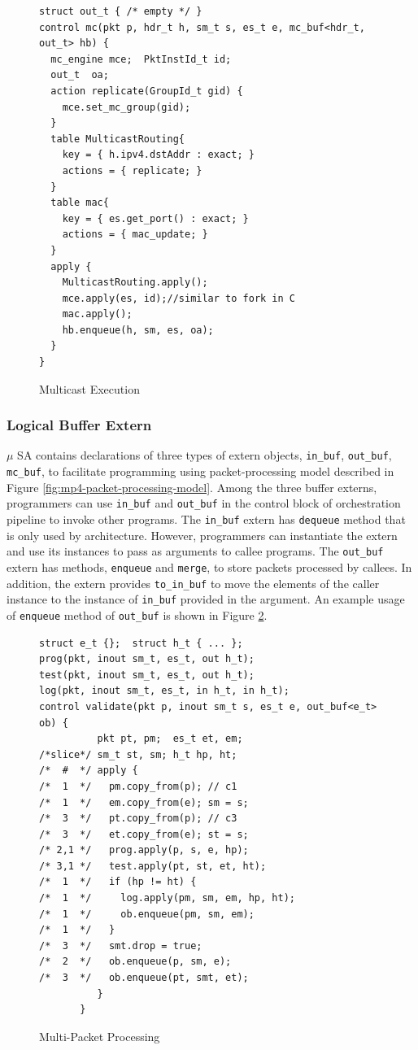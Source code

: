 \begin{figure}[!h]
\begin{lstlisting}[frame=none]
struct out_t { /* empty */ }
control mc(pkt p, hdr_t h, sm_t s, es_t e, mc_buf<hdr_t, out_t> hb) {
  mc_engine mce;  PktInstId_t id; 
  out_t  oa;
  action replicate(GroupId_t gid) {
    mce.set_mc_group(gid);
  }
  table MulticastRouting{
    key = { h.ipv4.dstAddr : exact; } 
    actions = { replicate; }
  }
  table mac{
    key = { es.get_port() : exact; } 
    actions = { mac_update; }
  }
  apply {
    MulticastRouting.apply();
    mce.apply(es, id);//similar to fork in C
    mac.apply();
    hb.enqueue(h, sm, es, oa);
  }
}
\end{lstlisting}
\caption{Multicast Execution}
\label{fig:multicast-execution}
\end{figure}

\subsubsection{Logical Buffer Extern}
\label{subsubsection:logical-buffer-extern}
$\mu$ SA contains declarations of three types of extern objects, \texttt{in\_buf}, \texttt{out\_buf}, \texttt{mc\_buf}, to facilitate programming using packet-processing model described in Figure \ref{fig:mp4-packet-processing-model}.
Among the three buffer externs, programmers can use \texttt{in\_buf} and \texttt{out\_buf} in the control block of orchestration pipeline to invoke other programs.
The \texttt{in\_buf} extern has \texttt{dequeue} method that is only used by architecture. 
However, programmers can instantiate the extern and use its instances to pass as arguments to callee programs.
The \texttt{out\_buf} extern has methods, \texttt{enqueue} and \texttt{merge}, to store packets processed by callees.
In addition, the extern provides \texttt{to\_in\_buf} to move the elements of the caller instance to the instance of \texttt{in\_buf} provided in the argument.
An example usage of \texttt{enqueue} method of \texttt{out\_buf} is shown in Figure \ref{fig:multi-packet-processing}.


\begin{figure}[!h]
 \begin{lstlisting}[frame=none]
struct e_t {};  struct h_t { ... };
prog(pkt, inout sm_t, es_t, out h_t);
test(pkt, inout sm_t, es_t, out h_t);
log(pkt, inout sm_t, es_t, in h_t, in h_t);
control validate(pkt p, inout sm_t s, es_t e, out_buf<e_t> ob) {
          pkt pt, pm;  es_t et, em;  
/*slice*/ sm_t st, sm; h_t hp, ht;
/*  #  */ apply {
/*  1  */   pm.copy_from(p); // c1
/*  1  */   em.copy_from(e); sm = s;
/*  3  */   pt.copy_from(p); // c3 
/*  3  */   et.copy_from(e); st = s;
/* 2,1 */   prog.apply(p, s, e, hp); 
/* 3,1 */   test.apply(pt, st, et, ht); 
/*  1  */   if (hp != ht) {
/*  1  */     log.apply(pm, sm, em, hp, ht);
/*  1  */     ob.enqueue(pm, sm, em);
/*  1  */   }
/*  3  */   smt.drop = true;
/*  2  */   ob.enqueue(p, sm, e);
/*  3  */   ob.enqueue(pt, smt, et);
          }
       }
\end{lstlisting}
\caption{Multi-Packet Processing}
\label{fig:multi-packet-processing}
\end{figure}



